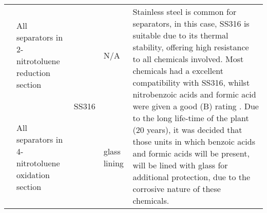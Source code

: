{\begin{tabular}{@{}lp{5cm}p{2cm}p{2cm}p{12cm}@{}}
                                                      & All separators in 2-nitrotoluene reduction section      & \multirow[t]{4}{=}{SS316}                                                                 & N/A                                               & \multirow[t]{4}{=}{Stainless steel is common for separators, in this case, SS316 is suitable due to its thermal stability, offering high resistance to all chemicals involved. Most chemicals had a excellent compatibility with SS316, whilst nitrobenzoic acids and formic acid were given a good (B) rating \cite{cp_lab_safety_stainless_nodate}. Due to the long life-time of the plant (20 years), it was decided that those units in which benzoic acids and formic acids will be present, will be lined with glass for additional protection, due to the corrosive nature of these chemicals.}                                                                                                                                                                                                                                                                                                                                                                \\ \cmidrule(l){2-2} \cmidrule(l){4-4}
                                                      & All separators in 4-nitrotoluene oxidation section      &                                                                                        & \multirow[t]{3}{=}{glass lining}                     &                                                                                                                                                                                                                                                                                                                                                                                                                                                                                                                                                                                                                                                                                                                                                                                                                                                                                                                    \\ \cmidrule(l){2-2}

\end{tabular}}

